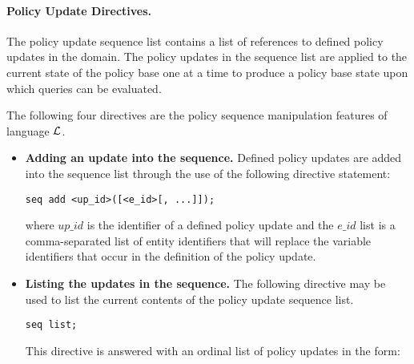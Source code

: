 \documentclass{llncs}
\begin{document}
        \paragraph{\bf Policy Update Directives.}

          The policy update sequence list contains a list of references to
          defined policy updates in the domain. The policy updates in the
          sequence list are applied to the current state of the policy base one
          at a time to produce a policy base state upon which queries can be
          evaluated.

          The following four directives are the policy sequence manipulation
          features of language $\cal{L}$.

          \begin{itemize}
            \item
              {\bf Adding an update into the sequence.} Defined policy updates
              are added into the sequence list through the use of the following
              directive statement:

              \begin{verbatim}seq add <up_id>([<e_id>[, ...]]);\end{verbatim}
                                                                                
              \noindent where $up\_id$ is the identifier of a defined policy
              update and the $e\_id$ list is a comma-separated list of entity
              identifiers that will replace the variable identifiers that occur
              in the definition of the policy update.

            \vspace{1mm}
            \item
              {\bf Listing the updates in the sequence.} The following
              directive may be used to list the current contents of the policy
              update sequence list.
                                                                                
              \begin{verbatim}seq list;\end{verbatim}
                                                                                
              This directive is answered with an ordinal list of policy
              updates in the form:
                                                                                

\end{itemize}
\end{document}
